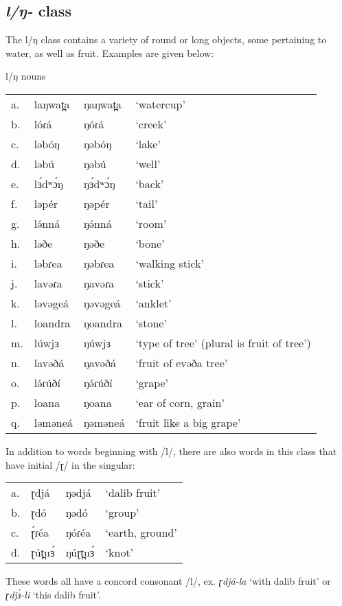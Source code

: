 \subsection{\textit{l/ŋ-} class}

The l/ŋ class contains a variety of round or long objects, some pertaining to water, as well as fruit. Examples are given below:

\ea 	l/ŋ nouns
\begin{tabular}[t]{llll}
a.&	laŋwat̪a	&ŋaŋwat̪a	&‘watercup’\\
b.&	lóɾá	&ŋóɾá		&‘creek’\\
c.&	ləbóŋ	&ŋəbóŋ		&‘lake’\\
d.&	ləbú	&ŋəbú		&‘well’\\
e.&	lɜ́dʷɔ́ŋ	&ŋɜ́dʷɔ́ŋ		&‘back’\\
f.&	ləpér	&ŋəpér		&‘tail’\\
g.&	lə́nná	&ŋə́nná		&‘room’\\
h.&	ləðe	&ŋəðe		&‘bone’\\
i.&	ləbɾea	&ŋəbɾea		&‘walking stick’\\
j.&	lavəɾa	&ŋavəɾa		&‘stick’\\
k.&	ləvəgeá	&ŋəvəgeá	&‘anklet’\\
l.&	loandra	&ŋoandra	&‘stone’\\
m.&	lúwjɜ	&ŋúwjɜ		&‘type of tree’ (plural is fruit of tree’)\\
n.&	lavəðá	&ŋavəðá		&‘fruit of evəða tree’\\
o.&	lə́ɾúðí	&ŋə́ɾúðí		&‘grape’\\
p.&	loana	&ŋoana		&‘ear of corn, grain’\\
q.&	ləməneá	&ŋəməneá	&‘fruit like a big grape’\\
\end{tabular} \z

In addition to words beginning with /l/, there are also words in this class that have initial /ɽ/ in the singular:

\ea
\begin{tabular}[t]{llll}
a.&	ɽdjá	&	ŋədjá	&	‘dalib fruit’ \\
b.&	ɽdó		&	ŋədó	&	‘group’\\
c.&	ɽ́ɾéa	&	ŋóɾéa	&	‘earth, ground’\\
d.&	ɽút̪uɜ́	&	ŋúɽt̪uɜ́	&	‘knot’\\
\end{tabular}
\z

These words all have a concord consonant /l/, ex. \textit{ɽdjá-la} ‘with dalib fruit’ or \textit{ɽdjɜ́-li} ‘this dalib fruit’.

